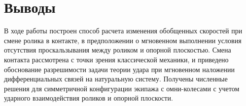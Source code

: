
\section{Выводы}

В ходе работы построен способ расчета изменения обобщенных скоростей при смене ролика в контакте, в предположении о мгновенном выполнении условия отсутствия проскальзывания между роликом и опорной плоскостью. Смена контакта рассмотрена с точки зрения классической механики, и приведено обоснование разрешимости задачи теории удара при мгновенном наложении дифференциальных связей на натуральную систему. Получены численные решения для симметричной конфигурации экипажа с омни-колесами с учетом ударного взаимодействия роликов и опорной плоскости.

